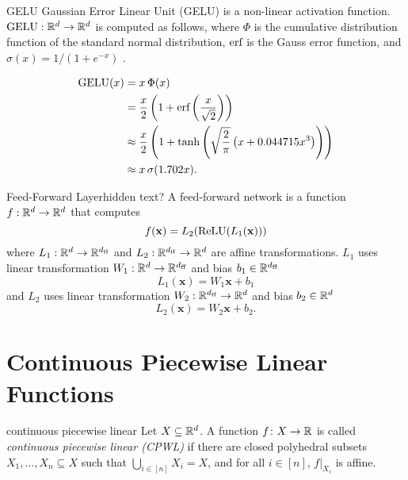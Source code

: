 \begin{definition}{GELU}{}
    Gaussian Error Linear Unit (GELU) is a non-linear activation function. $\text{GELU} : \mathbb{R}^d\to \mathbb{R}^d$ is computed as follows, where $\Phi$ is the cumulative distribution function of the standard normal distribution, $\text{erf}$ is the Gauss error function, and $\sigma(x) = 1/(1+e^{-x})$ \cite{hendrycks2023}.

    \begin{align}
        \text{GELU}(x) &= x\,\Phi(x) \\
        &= \frac{x}{2} \left(1 + \text{erf}\left(\frac{x}{\sqrt{2}}\right)\right) \\
        \label{eq:gelu}
        &\approx \frac{x}{2} \left(1 + \tanh\left(\sqrt{\frac{2}{\pi}} \left(x + 0.044715x^3\right)\right)\right) \\
        &\approx x\,\sigma(1.702 x).
    \end{align}
\end{definition}

\begin{definition}{Feed-Forward Layer}{hidden text?}
    A feed-forward network is a function $f:\mathbb{R}^d\to \mathbb{R}^d$ that computes
    \[f(\mathbf{x}) = L_2(\text{ReLU}(L_1(\mathbf{x})))\]
    where $L_1: \mathbb{R}^d \to \mathbb{R}^{d_{\text{ff}}}$ and $L_2: \mathbb{R}^{d_{\text{ff}}} \to \mathbb{R}^{d}$ are affine transformations. $L_1$ uses linear transformation $W_1:\mathbb{R}^d\to \mathbb{R}^{d_{\text{ff}}}$ and bias $b_1\in\mathbb{R}^{d_{\text{ff}}}$
    \[L_1(\mathbf{x}) = W_1 \mathbf{x} + b_1\]
    and $L_2$ uses linear transformation $W_2:\mathbb{R}^{d_{\text{ff}}}\to \mathbb{R}^d$ and bias $b_2\in\mathbb{R}^{d}$
    \[L_2(\mathbf{x}) = W_2 \mathbf{x} + b_2.\]
\end{definition}

\section{Continuous Piecewise Linear Functions}

\begin{definition}{continuous piecewise linear}{}
  Let $X \subseteq \mathbb{R}^d$. A function $f \colon X \to \mathbb{R}$ is called \emph{continuous piecewise linear (CPWL)} if there are closed polyhedral subsets $X_1, \ldots, X_n \subseteq X$ such that $\bigcup_{i\in [n]}  X_i = X$, and for all $i \in [n]$, $\left.f\right|_{X_i}$ is affine.
\end{definition}

